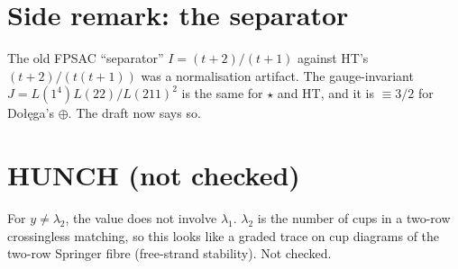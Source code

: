 \documentclass[10pt]{article}
\begin{document}
\section{Side remark: the separator}
The old FPSAC ``separator'' $I=(t+2)/(t+1)$ against HT's $(t+2)/(t(t+1))$ was a normalisation artifact.
The gauge-invariant $J=L(1^4)L(22)/L(211)^2$ is the same for $\star$ and HT, and it is $\equiv3/2$ for Do\l{}\k{e}ga's $\oplus$. The draft now says so.

\section*{HUNCH (not checked)}
For $y\neq\lambda_2$, the value does not involve $\lambda_1$. $\lambda_2$ is the number of cups in a two-row crossingless matching,
so this looks like a graded trace on cup diagrams of the two-row Springer fibre (free-strand stability). Not checked.
\end{document}
